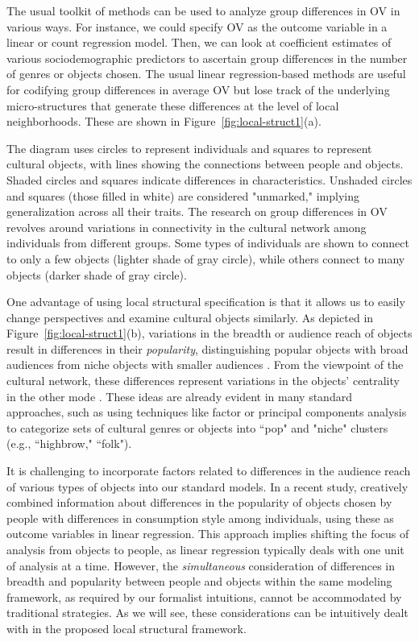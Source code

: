 \documentclass[preprint,12pt,authoryear]{elsarticle}
\begin{document}
The usual toolkit of methods can be used to analyze group differences in OV in various ways. For instance, we could specify OV as the outcome variable in a linear or count regression model. Then, we can look at coefficient estimates of various sociodemographic predictors to ascertain group differences in the number of genres or objects chosen. The usual linear regression-based methods are useful for codifying group differences in average OV but lose track of the underlying micro-structures that generate these differences at the level of local neighborhoods. These are shown in Figure~\ref{fig:local-struct1}(a). 

The diagram uses circles to represent individuals and squares to represent cultural objects, with lines showing the connections between people and objects. Shaded circles and squares indicate differences in characteristics. Unshaded circles and squares (those filled in white) are considered "unmarked," implying generalization across all their traits. The research on group differences in OV revolves around variations in connectivity in the cultural network among individuals from different groups. Some types of individuals are shown to connect to only a few objects (lighter shade of gray circle), while others connect to many objects (darker shade of gray circle).

One advantage of using local structural specification is that it allows us to easily change perspectives and examine cultural objects similarly. As depicted in Figure~\ref{fig:local-struct1}(b), variations in the breadth or audience reach of objects result in differences in their \textit{popularity}, distinguishing popular objects with broad audiences from niche objects with smaller audiences \citep{lizardo2018mutual}. From the viewpoint of the cultural network, these differences represent variations in the objects' centrality in the other mode \citep{faust1997centrality}. These ideas are already evident in many standard approaches, such as using techniques like factor or principal components analysis to categorize sets of cultural genres or objects into ``pop" and "niche" clusters (e.g., ``highbrow," ``folk").

It is challenging to incorporate factors related to differences in the audience reach of various types of objects into our standard models. In a recent study, \citet{puetz2021taste} creatively combined information about differences in the popularity of objects chosen by people with differences in consumption style among individuals, using these as outcome variables in linear regression. This approach implies shifting the focus of analysis from objects to people, as linear regression typically deals with one unit of analysis at a time. However, the \textit{simultaneous} consideration of differences in breadth and popularity between people and objects within the same modeling framework, as required by our formalist intuitions, cannot be accommodated by traditional strategies. As we will see, these considerations can be intuitively dealt with in the proposed local structural framework.
\end{document}
